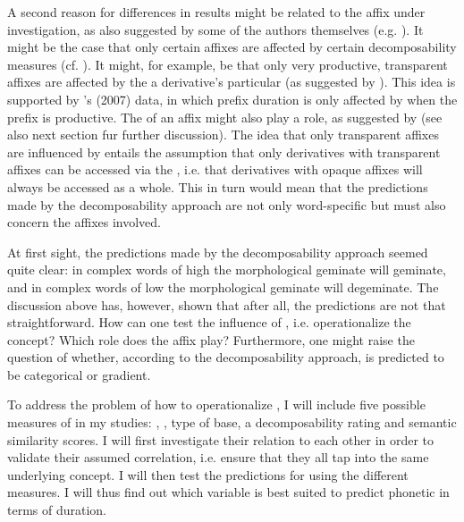 {{%
A second reason for differences in results might be related to the affix under investigation, as also suggested by some of the authors themselves (e.g. \citealt{Hanique.2011,Schuppler.2012}). It might be the case that only certain affixes are affected by certain decomposability measures (cf. \citealt{Collie.2008,Hanique.2011,Schuppler.2012}). It might, for example, be that only very productive, transparent affixes are affected by the a derivative's particular  (as suggested by \citealt{Hanique.2011}). This idea is supported by \citeauthor{Hay.2007}'s (2007) data, in which prefix duration is only affected by  when the prefix is productive. The  of an affix might also play a role, as suggested by \cite{Schuppler.2012} (see also next section fur further discussion). 
The idea that only transparent affixes are influenced by  entails the assumption that only derivatives with transparent affixes can be accessed via the ,  i.e. that derivatives with opaque affixes will always be accessed as a whole. This in turn would mean that the predictions made by the decomposability approach are not only word-specific but must also concern the affixes involved.



At first sight, the predictions made by the decomposability approach seemed quite clear: in complex words of high  the morphological geminate will geminate, and in complex words of low  the morphological geminate will degeminate. The discussion above has, however, shown that after all, the predictions are not that straightforward.
 How can one test the influence of , i.e. operationalize the concept? Which role does the affix play? Furthermore, one might raise the question of whether, according to the decomposability approach,  is predicted to be categorical or gradient. 




 To address the problem of how to operationalize , I will include five possible measures of  in my studies: , , type of base, a decomposability rating and semantic similarity scores. I will first investigate their relation to each other in order to validate their assumed correlation, i.e. ensure that they all tap into the same underlying concept. I will then test the predictions for  using the different measures. I will thus find out which variable is best suited to predict phonetic  in terms of duration.



}}
